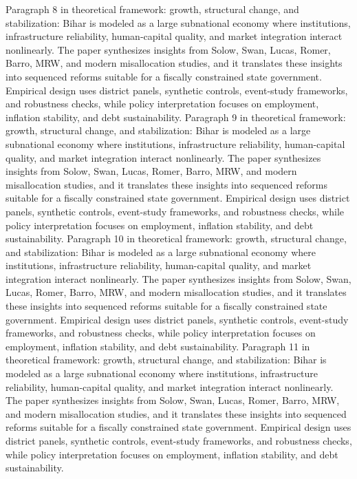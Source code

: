 \documentclass[preprint,12pt]{elsarticle}
\begin{document}
Paragraph 8 in theoretical framework: growth, structural change, and stabilization: Bihar is modeled as a large subnational economy where institutions, infrastructure reliability, human-capital quality, and market integration interact nonlinearly. The paper synthesizes insights from Solow, Swan, Lucas, Romer, Barro, MRW, and modern misallocation studies, and it translates these insights into sequenced reforms suitable for a fiscally constrained state government. Empirical design uses district panels, synthetic controls, event-study frameworks, and robustness checks, while policy interpretation focuses on employment, inflation stability, and debt sustainability.
Paragraph 9 in theoretical framework: growth, structural change, and stabilization: Bihar is modeled as a large subnational economy where institutions, infrastructure reliability, human-capital quality, and market integration interact nonlinearly. The paper synthesizes insights from Solow, Swan, Lucas, Romer, Barro, MRW, and modern misallocation studies, and it translates these insights into sequenced reforms suitable for a fiscally constrained state government. Empirical design uses district panels, synthetic controls, event-study frameworks, and robustness checks, while policy interpretation focuses on employment, inflation stability, and debt sustainability.
Paragraph 10 in theoretical framework: growth, structural change, and stabilization: Bihar is modeled as a large subnational economy where institutions, infrastructure reliability, human-capital quality, and market integration interact nonlinearly. The paper synthesizes insights from Solow, Swan, Lucas, Romer, Barro, MRW, and modern misallocation studies, and it translates these insights into sequenced reforms suitable for a fiscally constrained state government. Empirical design uses district panels, synthetic controls, event-study frameworks, and robustness checks, while policy interpretation focuses on employment, inflation stability, and debt sustainability.
Paragraph 11 in theoretical framework: growth, structural change, and stabilization: Bihar is modeled as a large subnational economy where institutions, infrastructure reliability, human-capital quality, and market integration interact nonlinearly. The paper synthesizes insights from Solow, Swan, Lucas, Romer, Barro, MRW, and modern misallocation studies, and it translates these insights into sequenced reforms suitable for a fiscally constrained state government. Empirical design uses district panels, synthetic controls, event-study frameworks, and robustness checks, while policy interpretation focuses on employment, inflation stability, and debt sustainability.
\end{document}
